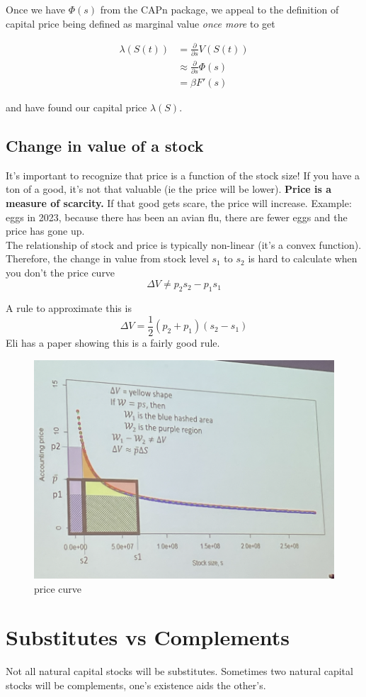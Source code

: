 \documentclass{article}
\begin{document}
Once we have $\Phi(s)$ from the CAPn package, we appeal to the definition of capital price being defined as marginal value \textit{once more} to get 

\begin{align}
    \lambda(S(t)) & = \frac{\partial }{\partial s} V(S(t))\\
    & \approx \frac{\partial}{\partial s} \Phi(s) \\
    & =\beta F'(s)
\end{align}

and have found our capital price $\lambda(S)$. \\


\subsection{Change in value of a stock}
It's important to recognize that price is a function of the stock size! If you have a ton of a good, it's not that valuable (ie the price will be lower). \textbf{Price is a measure of scarcity.} If that good gets scare, the price will increase. Example: eggs in 2023, because there has been an avian flu, there are fewer eggs and the price has gone up. \\

The relationship of stock and price is typically non-linear (it's a convex function). Therefore, the change in value from stock level $s_1$ to $s_2$ is hard to calculate when you don't the price curve 
$$\Delta V \neq p_2 s_2 - p_1 s_1$$

A rule to approximate this is 
$$ \Delta V = \frac{1}{2} (p_2 + p_1) (s_2 - s_1) $$
Eli has a paper showing this is a fairly good rule. 

\begin{figure}[htp]
    \centering
    \includegraphics[width=14cm]{Screen Shot 2023-02-20 at 10.09.06 AM.png}
    \caption{price curve}
\end{figure}

\section{Substitutes vs Complements}
Not all natural capital stocks will be substitutes. Sometimes two natural capital stocks will be complements, one's existence aids the other's. 
\end{document}
